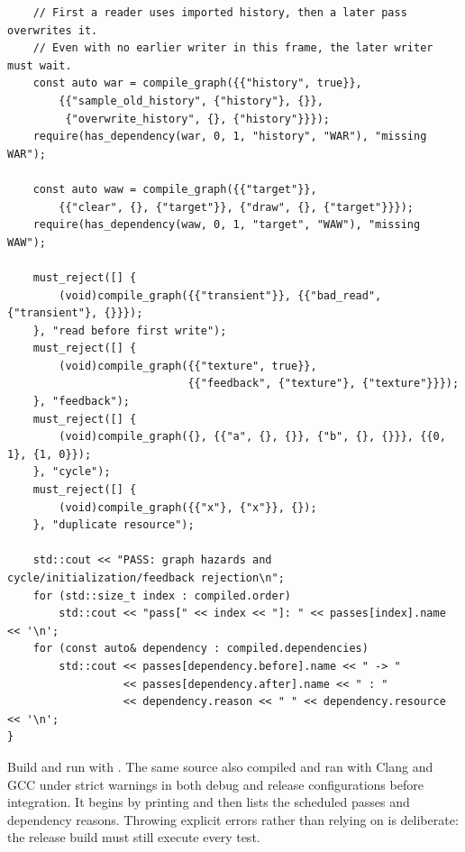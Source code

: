 \begin{verbatim}
    // First a reader uses imported history, then a later pass overwrites it.
    // Even with no earlier writer in this frame, the later writer must wait.
    const auto war = compile_graph({{"history", true}},
        {{"sample_old_history", {"history"}, {}},
         {"overwrite_history", {}, {"history"}}});
    require(has_dependency(war, 0, 1, "history", "WAR"), "missing WAR");

    const auto waw = compile_graph({{"target"}},
        {{"clear", {}, {"target"}}, {"draw", {}, {"target"}}});
    require(has_dependency(waw, 0, 1, "target", "WAW"), "missing WAW");

    must_reject([] {
        (void)compile_graph({{"transient"}}, {{"bad_read", {"transient"}, {}}});
    }, "read before first write");
    must_reject([] {
        (void)compile_graph({{"texture", true}},
                            {{"feedback", {"texture"}, {"texture"}}});
    }, "feedback");
    must_reject([] {
        (void)compile_graph({}, {{"a", {}, {}}, {"b", {}, {}}}, {{0, 1}, {1, 0}});
    }, "cycle");
    must_reject([] {
        (void)compile_graph({{"x"}, {"x"}}, {});
    }, "duplicate resource");

    std::cout << "PASS: graph hazards and cycle/initialization/feedback rejection\n";
    for (std::size_t index : compiled.order)
        std::cout << "pass[" << index << "]: " << passes[index].name << '\n';
    for (const auto& dependency : compiled.dependencies)
        std::cout << passes[dependency.before].name << " -> "
                  << passes[dependency.after].name << " : "
                  << dependency.reason << " " << dependency.resource << '\n';
}
\end{verbatim}

Build and run with . The same source also compiled and ran with Clang and GCC under strict warnings in both debug and release configurations before integration. It begins by printing  and then lists the scheduled passes and dependency reasons. Throwing explicit errors rather than relying on  is deliberate: the release build must still execute every test.

